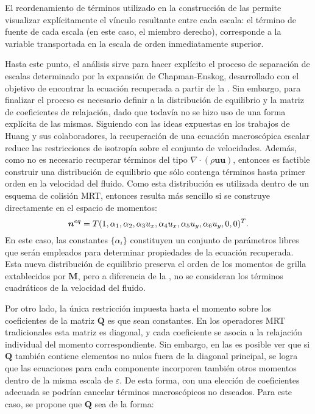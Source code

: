 El reordenamiento de t\'erminos utilizado en la construcci\'on de las  permite visualizar expl\'icitamente el v\'inculo resultante entre cada escala: el t\'ermino de fuente de cada escala (en este caso, el miembro derecho), corresponde a la variable transportada en la escala de orden inmediatamente superior.

Hasta este punto, el an\'alisis sirve para hacer expl\'icito el proceso de separaci\'on de escalas determinado por la expansi\'on de Chapman-Enskog, desarrollado con el objetivo de encontrar la ecuaci\'on recuperada a partir de la . Sin embargo, para finalizar el proceso es necesario definir a la distribuci\'on de equilibrio y la matriz de coeficientes de relajaci\'on, dado que todav\'ia no se hizo uso de una forma expl\'icita de las mismas. Siguiendo con las ideas expuestas en los trabajos de Huang y sus colaboradores, la recuperaci\'on de una ecuaci\'on macrosc\'opica escalar reduce las restricciones de isotrop\'ia sobre el conjunto de velocidades. Adem\'as, como no es necesario recuperar t\'erminos del tipo $\nabla \cdot(\rho \bm{uu})$, entonces es factible construir una distribuci\'on de equilibrio que s\'olo contenga t\'erminos hasta primer orden en la velocidad del fluido. Como esta distribuci\'on es utilizada dentro de un esquema de colisi\'on MRT, entonces resulta m\'as sencillo si se construye directamente en el espacio de momentos:
\begin{equation}
	\bm{n}^{eq} = T(1, \alpha_1, \alpha_2, \alpha_3 u_x, \alpha_4 u_x, \alpha_5 u_y, \alpha_6 u_y, 0, 0 )^T.
\end{equation}
En este caso, las constantes $\{ \alpha_i \}$ constituyen un conjunto de par\'ametros libres que ser\'an empleados para determinar propiedades de la ecuaci\'on recuperada. Esta nueva distribuci\'on de equilibrio preserva el orden de los momentos de grilla extablecidos por $\bm{M}$, pero a diferencia de la , no se consideran los t\'erminos cuadr\'aticos de la velocidad del fluido.

Por otro lado, la \'unica restricci\'on impuesta hasta el momento sobre los coeficientes de la matriz $\bm{Q}$ es que sean constantes. En los operadores MRT tradicionales esta matriz es diagonal, y cada coeficiente se asocia a la relajaci\'on individual del momento correspondiente. Sin embargo, en las  es posible ver que si $\bm{Q}$ tambi\'en contiene elementos no nulos fuera de la diagonal principal, se logra que las ecuaciones para cada componente incorporen tambi\'en otros momentos dentro de la misma escala de $\varepsilon$. De esta forma, con una elecci\'on de coeficientes adecuada se podr\'ian cancelar t\'erminos macrosc\'opicos no deseados. Para este caso, se propone que $\bm{Q}$ sea de la forma:

